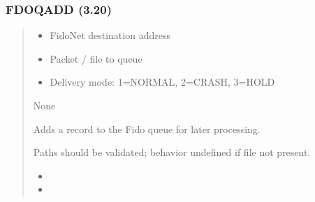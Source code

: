 \documentclass[letterpaper,10pt,english]{sphinxmanual}
\begin{document}
\subsubsection{FDOQADD (3.20)}
\label{\detokenize{ppl:fdoqadd-3-20}}\begin{quote}

\sphinxAtStartPar
{}
\begin{description}
\begin{itemize}
\item {} 
\sphinxAtStartPar
{}  \textendash{} FidoNet destination address

\item {} 
\sphinxAtStartPar
{}  \textendash{} Packet / file to queue

\item {} 
\sphinxAtStartPar
{} \textendash{} Delivery mode: 1=NORMAL, 2=CRASH, 3=HOLD

\end{itemize}

\sphinxAtStartPar
None

\sphinxAtStartPar
Adds a record to the Fido queue for later processing.

\end{description}

\sphinxAtStartPar
{}
\begin{quote}

\begin{sphinxVerbatim}[commandchars=\\\{\}]
 
\end{sphinxVerbatim}
\end{quote}
\begin{description}
\sphinxAtStartPar
Paths should be validated; behavior undefined if file not present.

\begin{itemize}
\item {} 
\sphinxAtStartPar
{}

\item {} 
\sphinxAtStartPar
{}

\end{itemize}

\end{description}
\end{quote}
\end{document}
